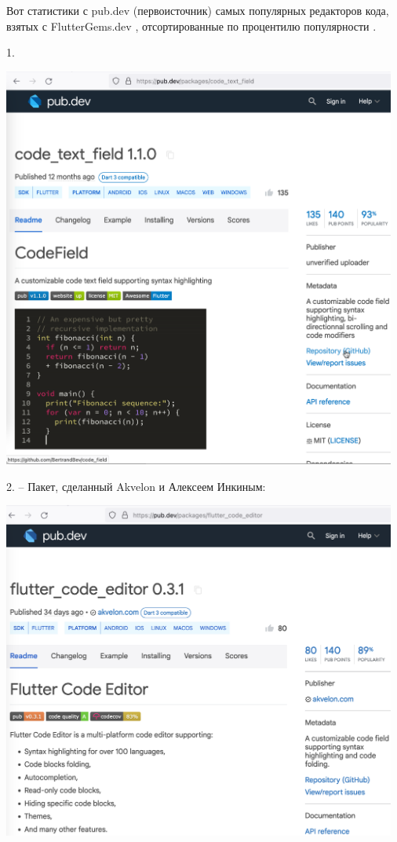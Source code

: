 
Вот статистики с pub.dev (первоисточник) самых популярных редакторов кода, взятых с FlutterGems.dev ,
отсортированные по процентилю популярности .

1.

\begin{center}
    \includegraphics[width=35em]{code_text_field}
\end{center}
\pagebreak

2. -- Пакет, сделанный Akvelon и Алексеем Инкиным:

\begin{center}
    \includegraphics[width=35em]{flutter_code_editor}
\end{center}
\pagebreak

